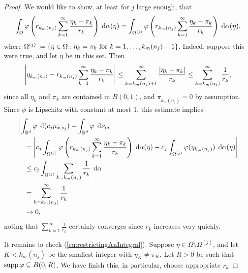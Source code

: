 \begin{proof}
    We would like to show, at least for $j$ large enough, that
    \begin{equation} \label{eq:restrictingAnIntegral}
        \int_{\Omega} \varphi\left( {r_{k_m(n_j)} \sum_{k=1}^\infty \frac{\eta_k - \pi_k}{r_k}} \right) \; \operatorname{d}\!{\alpha}(\eta) 
        = \int_{\Omega^{(j)}} \varphi\left( {r_{k_m(n_j)} \sum_{k=1}^\infty \frac{\eta_k - \pi_k}{r_k}} \right) \; \operatorname{d}\!{\alpha}(\eta),
    \end{equation}
    where $\Omega^{(j)} := \left\{ { \eta \in \Omega : \eta_k = \pi_k \text{ for } k = 1,\dots,k_m(n_j)-1 } \right\}$. Indeed, suppose this were true, and let $\eta$ be in this set. Then
    \begin{equation}
        \left\vert { \eta_{k_m(n_j)} - r_{k_m(n_j)} \sum_{k=1}^\infty \frac{\eta_k - \pi_k}{r_k} } \right\vert \leq  \sum_{k=k_m(n_j)+1}^\infty \frac{\left\vert {\eta_k - \pi_k} \right\vert}{r_k}
        \leq \sum_{k=k_m(n_j)}^\infty \frac{1}{r_k},
    \end{equation}
    since all $\eta_k$ and $\pi_k$ are contained in $B(0,1)$, and $\pi_{k_m(n_j)} = 0$ by assumption. Since $\phi$ is Lipschitz with constant at most 1, this estimate implies
    \begin{equation} \begin{aligned}
        &\left\vert { \int_{\mathbb{R}^d} \varphi\; \ensuremath{\operatorname{d}\!{(}}c_j \mu_{\overline{x},s_j}) - \int_{\mathbb{R}^d} \varphi\; \ensuremath{\operatorname{d}\!{\nu}}_m } \right\vert \\
        &\quad = \left\vert { c_j \int_{\Omega^{(j)}} \varphi\left( {r_{k_m(n_j)} \sum_{k=1}^\infty \frac{\eta_k - \pi_k}{r_k}} \right) \; \ensuremath{\operatorname{d}\!{\alpha}}(\eta)
                      - c_j \int_{\Omega^{(j)}} \varphi(\eta_{k_m(n_j)}) \; \ensuremath{\operatorname{d}\!{\alpha}}(\eta) } \right\vert \\
        &\quad \leq c_j \int_{\Omega^{(j)}} \sum_{k=k_m(n_j)} \frac{1}{r_k} \; \operatorname{d}\!{\alpha} \\
        &\quad = \sum_{k = k_m(n_j)}^\infty \frac{1}{r_k} \\
        &\quad \rightarrow 0,
    \end{aligned} \end{equation}
    noting that $\sum_{k=1}^\infty \frac{1}{r_k}$ certainly converges since $r_k$ increases very quickly.

    It remains to check (\ref{eq:restrictingAnIntegral}). Suppose $\eta \in \Omega \setminus \Omega^{(j)}$, and let $K < k_m(n_j)$ be the smallest integer with $\eta_K \neq \pi_K$. Let $R > 0$ be such that $\operatorname{supp}{\varphi} \subseteq B(0,R)$. We have {\color{red} finish this. in particular, choose appropriate $r_k$}
\end{proof}

